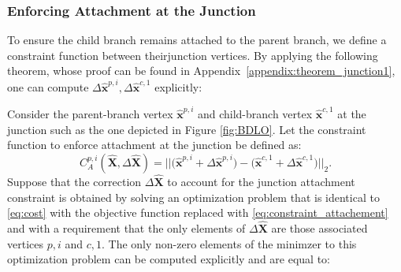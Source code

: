 \subsubsection{Enforcing Attachment at the Junction}
\label{sec:Attachment Enforcement at the Junction}
To ensure the child branch remains attached to the parent branch, we define a constraint function between theirjunction vertices. 
By applying the following theorem, whose proof can be found in Appendix~\ref{appendix:theorem_junction1}, one can compute $\Delta \hat{\mathbf{x}}^{p,i}, \Delta \hat{\mathbf{x}}^{c,1}$ explicitly:
\begin{thm} 
\label{theorem:constraint_attachement}
Consider the parent-branch vertex $\hat{\mathbf{x}}^{p,i}$ and child-branch vertex $\hat{\mathbf{x}}^{c,1}$ at the junction such as the one depicted in Figure \ref{fig:BDLO}.
\label{thm:attachment}
Let the constraint function to enforce attachment at the junction be defined as:
\begin{equation}
\label{eq:constraint_attachement}
 C^{p,i}_A(\hat{\mathbf{X}}, \Delta \hat{\mathbf{X}}) = ||\bigl(\hat{\mathbf{x}}^{p,i} + \Delta \hat{\mathbf{x}}^{p,i}\bigr) - \bigl(\hat{\mathbf{x}}^{c,1} + \Delta \hat{\mathbf{x}}^{c,1}\bigr)||_2. 
    \end{equation}
Suppose that the correction $\Delta \hat{\mathbf{X}}$ to account for the junction attachment constraint is obtained by solving an optimization problem that is identical to \eqref{eq:cost} with the objective function replaced with \eqref{eq:constraint_attachement} and with a requirement that the only elements of $\Delta \hat{\mathbf{X}}$ are those associated vertices $p,i$ and $c,1$.
The only non-zero elements of the minimzer to this optimization problem can be computed explicitly and are equal to: 
\begin{equation*}

\end{equation*}
\end{thm}
